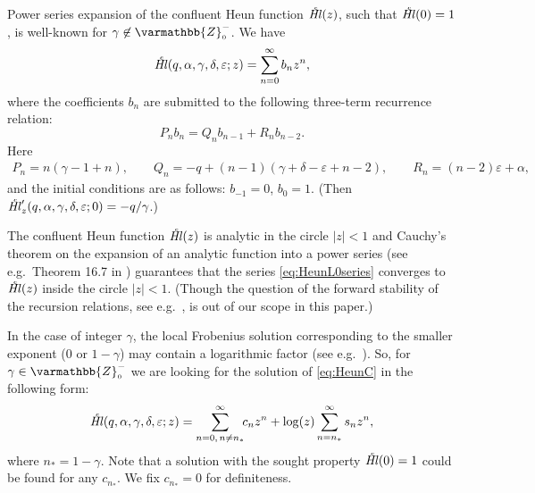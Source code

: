 \documentclass[11pt]{article}
\newcommand{\MF}[1]{\mathop{#1}\nolimits}
\newcommand{\Zzo}{\varmathbb{Z}_{\scriptscriptstyle0}^{-}}%
\def\nsp{n_*}%
\def\HeunCl{\setbox0=\hbox{\tiny\itshape\bfseries \kern1.52mm c}\wd0=0pt\ht0=0pt\dp0=0pt\MF{\textit{\hbox{\raise1.67ex\copy0}Hl\/}}}%
\begin{document}
Power series expansion of the confluent Heun function $\HeunCl(z)$, such that
$\HeunCl(0)=1$, is well-known
for $\gamma\not\in\Zzo$. We have
\begin{equation}
\HeunCl(q,\alpha,\gamma,\delta,\varepsilon;z)=\sum_{n=0}^{\infty}b_n z^n,
\label{eq:HeunL0series}
\end{equation}
where the coefficients $b_n$ are submitted to the following three-term
recurrence relation:
\begin{equation}
  P_n b_n=Q_n b_{n-1}+R_n b_{n-2}.
\label{eq:HeunL0Andef}
\end{equation}
Here
\begin{equation}
\begin{gathered}
P_n = n (\gamma-1+n),\qquad
Q_n = -q+(n-1)(\gamma+\delta-\varepsilon+n-2),\qquad 
R_n = (n-2)\varepsilon+\alpha,
\end{gathered}
\label{eq:PQRdef}
\end{equation}
and the initial conditions are as follows: $b_{-1}=0$, $b_0=1$. (Then $\HeunCl'_z(q,\alpha,\gamma,\delta,\varepsilon;0)=-q/\gamma$.)

The confluent Heun function
$\HeunCl(z)$ is analytic in the circle $|z|<1$ and
Cauchy's theorem on the expansion of an analytic function into a power series
(see e.g.\ Theorem 16.7 in \cite[Part~I]{Markushevich1977}) guarantees that the
series \eqref{eq:HeunL0series} converges to $\HeunCl(z)$ inside the circle
$|z|<1$. (Though the question of the forward stability of the recursion relations, see e.g.\ \cite{Wimp1984}, is out of our scope in this paper.) 

In the case of integer $\gamma$, the local Frobenius solution corresponding to the
smaller exponent ($0$ or $1-\gamma$) may contain a logarithmic factor (see e.g.\
\cite{Kamke1944,Wasow}). So, for $\gamma\in\Zzo$ we are looking for the
solution of \eqref{eq:HeunC} in the following form:
\begin{equation}
\HeunCl(q,\alpha,\gamma,\delta,\varepsilon;z)=\sum_{n=0,\,n\neq\nsp}^{\infty}\!\!c_n
z^n +\log(z)\sum_{n=\nsp}^{\infty}s_n z^n,
\label{eq:HeunLserieslog}
\end{equation}
where $\nsp=1-\gamma$. Note that a solution with the sought property
$\HeunCl(0)=1$ could be found for any $c_{\nsp}$. We fix $c_{\nsp}=0$ for
definiteness.
\end{document}
